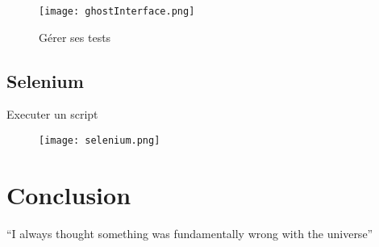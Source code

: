 \documentclass{article}
\begin{document}
\begin{figure}[H]
\centering
\texttt{[image: ghostInterface.png]}
\caption{Gérer ses tests}
\end{figure}

\subsection{Selenium}

Executer un script\\
\begin{figure}[H]
\centering
\texttt{[image: selenium.png]}
\caption{}
\end{figure}

\section{Conclusion}
``I always thought something was fundamentally wrong with the universe'' \citep{adams1995hitchhiker}



\end{document}
